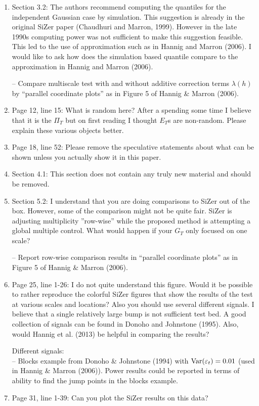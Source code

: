 \documentclass[a4paper,12pt]{article}
\begin{document}
\newpage
{} 
\vspace{0.25cm}

\begin{enumerate}
\item Section 3.2: The authors recommend computing the quantiles for the independent Gaussian case by simulation. This suggestion is already in the original SiZer paper (Chaudhuri and Marron, 1999). However in the late 1990s computing power was not sufficient to make this suggestion feasible. This led to the use of approximation such as in Hannig and Marron (2006). I would like to ask how does the simulation based quantile compare to the approximation in Hannig and Marron (2006). 

-- Compare multiscale test with and without additive correction terms $\lambda(h)$ by ``parallel coordinate plots'' as in Figure 5 of Hannig \& Marron (2006). 

\item Page 12, line 15: What is random here? After a spending some time I believe that it is the $\Pi_T$ but on first reading I thought $E_T$s are non-random. Please explain these various objects better.
\item Page 18, line 52: Please remove the speculative statements about what can be shown unless you actually show it in this paper.

\item Section 4.1: This section does not contain any truly new material and should be removed.

\item Section 5.2: I understand that you are doing comparisons to SiZer out of the box. However, some of the comparison might not be quite fair. SiZer is adjusting multiplicity ”row-wise” while the proposed method is attempting a global multiple control. What would happen if your $G_T$ only focused on one scale?

-- Report row-wise comparison results in ``parallel coordinate plots'' as in Figure 5 of Hannig \& Marron (2006). 

\item Page 25, line 1-26: I do not quite understand this figure. Would it be possible to rather reproduce the colorful SiZer figures that show the results of the test at various scales and locations? Also you should use several different signals. I believe that a single relatively large bump is not sufficient test bed. A good collection of signals can be found in Donoho and Johnstone (1995). Also, would Hannig et al. (2013) be helpful in comparing the results?

Different signals: \\
-- Blocks example from Donoho \& Johnstone (1994) with $\textnormal{Var}(\varepsilon_t) = 0.01$ (used in Hannig \& Marron (2006)). Power results could be reported in terms of ability to find the jump points in the blocks example. 

\item Page 31, line 1-39: Can you plot the SiZer results on this data?
\end{enumerate}
\end{document}
